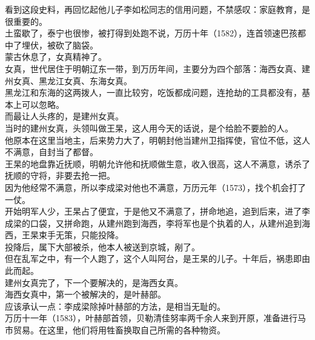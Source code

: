 \begin{multicols}{\theparacolNo}
看到这段史料，再回忆起他儿子李如松同志的信用问题，不禁感叹：家庭教育，是很重要的。\\

土蛮歇了，泰宁也很惨，被打得到处跑不说，万历十年（1582），连首领速巴孩都中了埋伏，被砍了脑袋。\\

蒙古休息了，女真精神了。\\

女真，世代居住于明朝辽东一带，到万历年间，主要分为四个部落：海西女真、建州女真、黑龙江女真、东海女真。\\

黑龙江和东海的这两拨人，一直比较穷，吃饭都成问题，连抢劫的工具都没有，基本上可以忽略。\\

而最让人头疼的，是建州女真。\\

当时的建州女真，头领叫做王杲，这人用今天的话说，是个给脸不要脸的人。\\

他原本在这里当地主，后来势力大了，明朝封他当建州卫指挥使，官位不低，这人不满意，自封当了都督。\\

王杲的地盘靠近抚顺，明朝允许他和抚顺做生意，收入很高，这人不满意，诱杀了抚顺的守将，非要去抢一把。\\

因为他经常不满意，所以李成梁对他也不满意，万历元年（1573），找个机会打了一仗。\\

开始明军人少，王杲占了便宜，于是他又不满意了，拼命地追，追到后来，进了李成梁的口袋，又拼命跑，从建州跑到海西，李将军也是个执着的人，从建州追到海西，王杲束手无策，只能投降。\\

投降后，属下大部被杀，他本人被送到京城，剐了。\\

但在乱军之中，有一个人跑了，这个人叫阿台，是王杲的儿子。十年后，祸患即由此而起。\\

建州女真完了，下一个要解决的，是海西女真。\\

海西女真中，第一个被解决的，是叶赫部。\\

应该承认一点：李成梁除掉叶赫部的方法，是相当无耻的。\\

万历十一年（1583），叶赫部首领，贝勒清佳努率两千余人来到开原，准备进行马市贸易。在这里，他们将用牲畜换取自己所需的各种物资。\\


\end{multicols}
